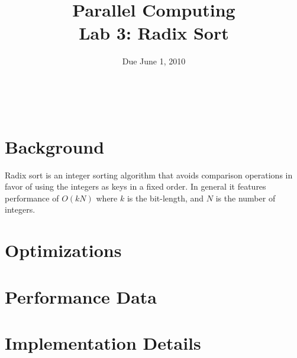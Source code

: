 \documentclass[12pt]{article}
\title{ Parallel Computing \\ Lab 3: Radix Sort }
\author{\MyFullName}
\date{ Due June 1, 2010 }
\renewcommand{\indent}{\hspace{0.25in}}
\begin{document}
\maketitle
\thispagestyle{empty}
\begin{center}
\end{center}
\setcounter{page}{0}
\newpage

\def\thesection{\Roman{section}.}
\hfill \\
\section{ Background }

\indent Radix sort is an integer sorting algorithm that avoids comparison operations in favor of using the integers as keys in a fixed order. In general it features performance of $O(k N)$ where $k$ is the bit-length, and $N$ is the number of integers.



\section{ Optimizations }

\section{ Performance Data }

\section{ Implementation Details }
\end{document}
